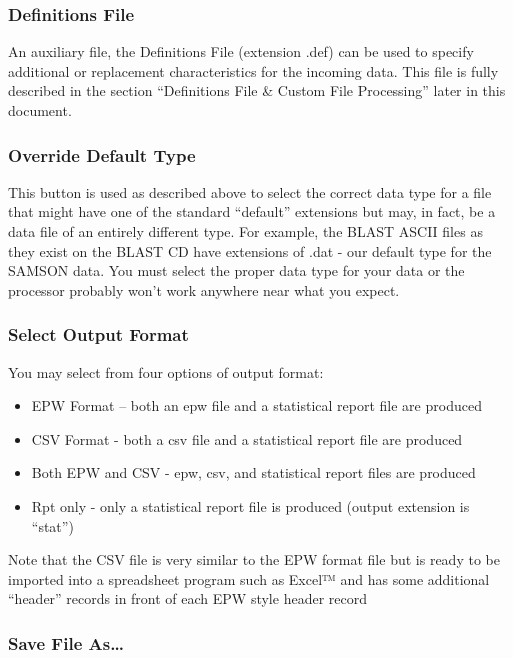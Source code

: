 \subsubsection{Definitions File}\label{definitions-file}

An auxiliary file, the Definitions File (extension .def) can be used to specify additional or replacement characteristics for the incoming data. This file is fully described in the section ``Definitions File \& Custom File Processing'' later in this document.

\subsubsection{Override Default Type}\label{override-default-type}

This button is used as described above to select the correct data type for a file that might have one of the standard ``default'' extensions but may, in fact, be a data file of an entirely different type. For example, the BLAST ASCII files as they exist on the BLAST CD have extensions of .dat - our default type for the SAMSON data. You must select the proper data type for your data or the processor probably won't work anywhere near what you expect.

\subsubsection{Select Output Format}\label{select-output-format}

You may select from four options of output format:

\begin{itemize}
\item
  EPW Format -- both an epw file and a statistical report file are produced
\item
  CSV Format - both a csv file and a statistical report file are produced
\item
  Both EPW and CSV - epw, csv, and statistical report files are produced
\item
  Rpt only - only a statistical report file is produced (output extension is ``stat'')
\end{itemize}

Note that the CSV file is very similar to the EPW format file but is ready to be imported into a spreadsheet program such as Excel™ and has some additional ``header'' records in front of each EPW style header record

\subsubsection{Save File As\ldots{}}\label{save-file-as}

